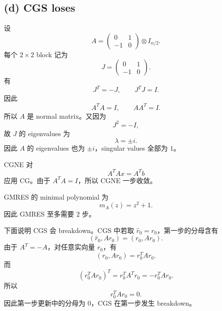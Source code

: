 \documentclass{ctexart}
\begin{document}
\begin{solution}
  \subsection*{(d) CGS loses}
  设
  \[
    A=
    \begin{pmatrix}0&1\\-1&0
    \end{pmatrix}\otimes I_{n/2}.
  \]
  每个 $2\times2$ block 记为
  \[
    J=
    \begin{pmatrix}0&1\\-1&0
    \end{pmatrix}.
  \]
  有
  \[
    J^T=-J, \qquad J^TJ=I.
  \]
  因此
  \[
    A^TA=I, \qquad AA^T=I.
  \]
  所以 $A$ 是 normal matrix。又因为
  \[
    J^2=-I,
  \]
  故 $J$ 的 eigenvalues 为
  \[
    \lambda=\pm i.
  \]
  因此 $A$ 的 eigenvalues 也为 $\pm i$，singular values 全部为 $1$。

  CGNE 对
  \[
    A^TAx=A^Tb
  \]
  应用 CG。由于 $A^TA=I$，所以 CGNE 一步收敛。

  GMRES 的 minimal polynomial 为
  \[
    m_A(z)=z^2+1.
  \]
  因此 GMRES 至多需要 $2$ 步。

  下面说明 CGS 会 breakdown。CGS 中若取 $\hat r_0=r_0$，第一步的分母含有
  \[
    (\hat r_0,Ar_0)=(r_0,Ar_0).
  \]
  由于 $A^T=-A$，对任意实向量 $r_0$，有
  \[
    (r_0,Ar_0)=r_0^TAr_0.
  \]
  而
  \[
    (r_0^TAr_0)^T=r_0^TA^Tr_0=-r_0^TAr_0.
  \]
  所以
  \[
    r_0^TAr_0=0.
  \]
  因此第一步更新中的分母为 $0$，CGS 在第一步发生 breakdown。

\end{solution}
\end{document}
